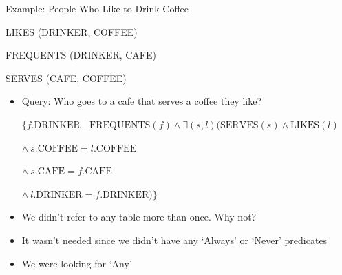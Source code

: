 \documentclass[aspectratio=169]{beamer}
\newenvironment{noindentitemize}
{ \begin{itemize}
 \setlength{\itemsep}{1.5ex}
  \setlength{\parsep}{0pt}   
  \setlength{\parskip}{0pt}
 \addtolength{\leftskip}{-2em}
 }
{ \end{itemize} }
\begin{document}
\begin{frame}{Example: People Who Like to Drink Coffee}

LIKES (DRINKER, COFFEE)

FREQUENTS (DRINKER, CAFE)

SERVES (CAFE, COFFEE)

\begin{noindentitemize}
\item Query: Who goes to a cafe that serves a coffee they like?

\vspace{10 pt}
$\{f.\textrm{DRINKER } | \textrm{ FREQUENTS}(f) \wedge \exists(s, l)(\textrm{SERVES}(s) \wedge \textrm{LIKES}(l)$

\hspace{2em} $\wedge\ s.\textrm{COFFEE} = l.\textrm{COFFEE}$

\hspace{2em} $\wedge\ s.\textrm{CAFE} = f.\textrm{CAFE}$

\hspace{2em} $\wedge\ l.\textrm{DRINKER} = f.\textrm{DRINKER}) \}$

\item We didn't refer to any table more than once. Why not?
\item It wasn't needed since we didn't have any `Always' or `Never' predicates
\item We were looking for `Any'
\end{noindentitemize}
\end{frame}
\end{document}
